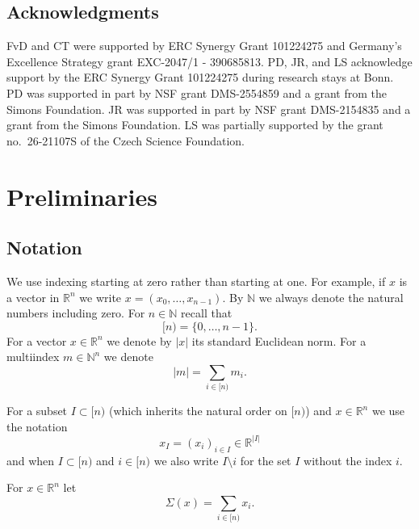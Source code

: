 \documentclass[12pt,reqno]{amsart}
\theoremstyle{plain}
\numberwithin{equation}{section}
\theoremstyle{remark}
\newcommand{\R}{{\mathbb R}}
\newcommand{\N}{{\mathbb N}}
\begin{document}
\subsection*{Acknowledgments}

FvD and CT were supported by
ERC Synergy Grant 101224275 and Germany's
Excellence Strategy grant
 EXC-2047/1 - 390685813.
PD, JR, and LS acknowledge support by 
the ERC Synergy Grant 101224275 during research stays at Bonn. PD was supported in part by NSF grant DMS-2554859 and a grant from the Simons Foundation. JR was supported in part by NSF grant DMS-2154835 and a grant from the Simons Foundation.
LS was partially supported by the grant no.\ 26-21107S of the Czech Science Foundation.



\section{Preliminaries}\label{sec:prelim}

\newcommand{\g}{\mathfrak{g}}

\subsection{Notation}
We use indexing starting at zero rather than starting at one. For example, if $x$ is a vector in $\R^n$ we write $x=(x_0,\dots,x_{n-1})$. By $\N$ we always denote the natural numbers including zero.
For $n\in\N$ recall that
\begin{equation}\label{auto:index-set-definition} [n)=\{0,\dots,n-1\}. \end{equation}
For a vector $x\in\R^n$ we denote by $|x|$ its standard Euclidean norm. For a multiindex $m\in\N^n$ we denote
\begin{equation}\label{auto:multiindex-length} |m| = \sum_{i\in [n)}m_i. \end{equation}

For a subset $I\subset [n)$ (which inherits the natural order on $[n)$) and $x\in \R^n$ we use the notation
\begin{equation}\label{auto:coordinate-subvector} x_I = (x_{i})_{i\in I} \in \mathbb{R}^{|I|} \end{equation}
and when $I\subset [n)$ and $i\in [n)$ we also write $I\setminus i$ for the set $I$ without the index $i$.

For $x\in \R^n$ let
\begin{equation}\label{auto:coordinate-sum}\Sigma(x)=\sum_{i\in[n)} x_i.\end{equation}
\end{document}
